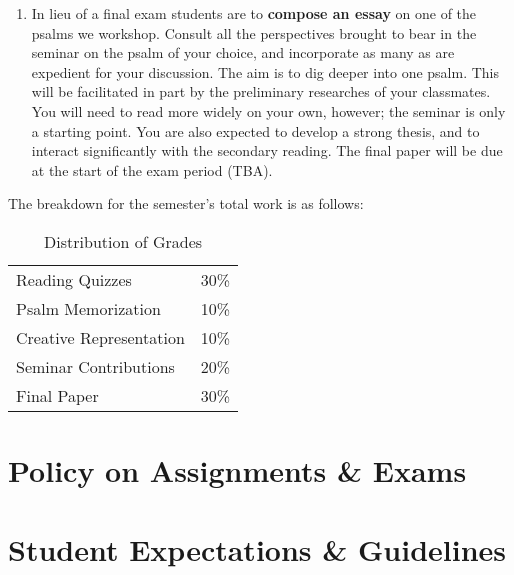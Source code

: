 \documentclass[titlepage]{article}
\newcommand\policy{../policy}
\begin{document}
\begin{enumerate}
 \item In lieu of a final exam students are to \textbf{compose an essay}
   on one of the psalms we workshop. Consult all the perspectives
   brought to bear in the seminar on the psalm of your choice, and
   incorporate as many as are expedient for your discussion. The aim is
   to dig deeper into one psalm. This will be facilitated in part by the
   preliminary researches of your classmates. You will need to read more
   widely on your own, however; the seminar is only a starting point.
   You are also expected to develop a strong thesis, and to interact
   significantly with the secondary reading. The final paper will be due
   at the start of the exam period (TBA).

\end{enumerate}

The breakdown for the semester's total work is as follows:

\begin{table}[htbp]
  \centering
  \begin{tabular}{lr}
    \toprule
    Reading Quizzes         & 30\% \\
    Psalm Memorization      & 10\% \\
    Creative Representation & 10\% \\
    Seminar Contributions   & 20\% \\
    Final Paper             & 30\% \\
    \bottomrule
  \end{tabular}
  \caption{Distribution of Grades}
  \label{distribution}
\end{table}



\section{Policy on Assignments \& Exams}
\label{policy}



%

\section{Student Expectations \& Guidelines}
\label{expectations}






\end{document}

